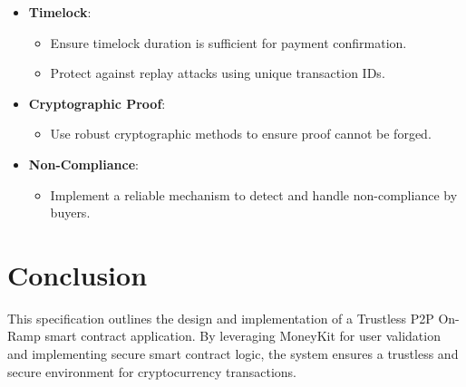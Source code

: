 \documentclass[11pt,oneside,a4paper]{article}
\begin{document}
\begin{itemize}
    \item \textbf{Timelock}:
    \begin{itemize}
        \item Ensure timelock duration is sufficient for payment confirmation.
        \item Protect against replay attacks using unique transaction IDs.
    \end{itemize}

    \item \textbf{Cryptographic Proof}:
    \begin{itemize}
        \item Use robust cryptographic methods to ensure proof cannot be forged.
    \end{itemize}

    \item \textbf{Non-Compliance}:
    \begin{itemize}
        \item Implement a reliable mechanism to detect and handle non-compliance by buyers.
    \end{itemize}
\end{itemize}

\section{Conclusion}

This specification outlines the design and implementation of a Trustless P2P On-Ramp smart contract application. By leveraging MoneyKit for user validation and implementing secure smart contract logic, the system ensures a trustless and secure environment for cryptocurrency transactions.
\end{document}
